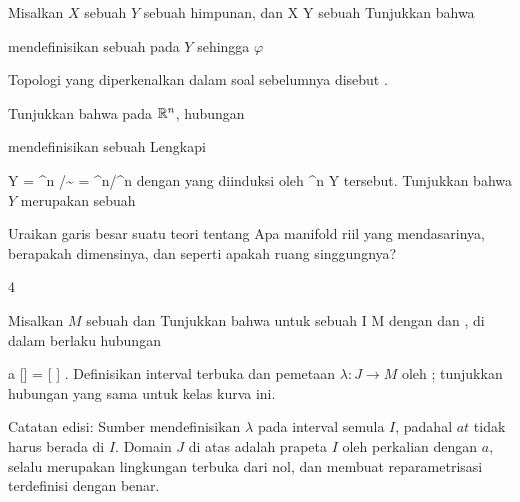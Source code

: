 {}
{

Misalkan $X$ sebuah
$Y$ sebuah himpunan, dan
\maabbdisp {\varphi} { X } { Y
} {}
sebuah
Tunjukkan bahwa

 {  }

mendefinisikan sebuah
pada $Y$ sehingga $\varphi$

}
{} {}

Topologi yang diperkenalkan dalam soal sebelumnya disebut  {.}

{}
{

Tunjukkan bahwa pada ${\mathbb R}^n$, hubungan

 {  }

mendefinisikan sebuah
Lengkapi

\mavergleichskettedisp
{\vergleichskette
{Y
}
{ =} {\R^n /\!\!\sim
}
{ =} {\R^n/\Z^n
}
{ } {
}
{ } {
}
}
{}{}{}
dengan
yang diinduksi oleh
\maabb {\varphi} {\R^n } { Y
} {}
tersebut. Tunjukkan bahwa $Y$ merupakan sebuah

}
{} {}

{}
{

Uraikan garis besar suatu teori tentang  Apa manifold riil yang mendasarinya, berapakah
 {} {}
dimensinya, dan seperti apakah ruang singgungnya?

}
{} {}


{4}
{

Misalkan $M$ sebuah
 dan
 Tunjukkan bahwa untuk sebuah
\maabbdisp {\gamma} { I } { M
} {}
dengan
 dan
, di dalam
 berlaku hubungan

\mavergleichskettedisp
{\vergleichskette
{a [\gamma]
}
{ =} { [  \lambda]
}
{ } {
}
{ } {
}
{ } {
}
}
{}{}{}. Definisikan interval terbuka
dan pemetaan $\lambda:J\to M$ oleh
; tunjukkan hubungan yang sama untuk kelas kurva ini.

Catatan edisi: Sumber mendefinisikan $\lambda$ pada interval semula $I$, padahal $at$ tidak harus berada di $I$. Domain $J$ di atas adalah prapeta $I$ oleh perkalian dengan $a$, selalu merupakan lingkungan terbuka dari nol, dan membuat reparametrisasi terdefinisi dengan benar.

}
{} {}

